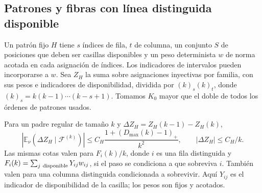 \subsection{Patrones y fibras con línea distinguida disponible}
Un patrón fijo $H$ tiene $s$ índices de fila, $t$ de columna, un conjunto $S$ de posiciones que deben
ser casillas disponibles y un peso determinista $w$ de norma acotada en cada asignación de índices.
Los indicadores de intervalos pueden incorporarse a $w$. Sea $Z_H$ la suma sobre asignaciones
inyectivas por familia, con sus pesos e indicadores de disponibilidad, dividida por $(k)_s(k)_t$,
donde $(k)_s=k(k-1)\cdots(k-s+1)$. Tomamos $K_0$ mayor que el doble de todos los órdenes de patrones
usados.
\begin{lema}\label{lema:incrementos-meso}
Para un padre regular de tamaño $k$ y $\Delta Z_H=Z_H(k-1)-Z_H(k)$,
\[
 |\mathbb E_\nu(\Delta Z_H\mid\mathcal F^{(k)})|
 \le C_H\frac{1+(D_{\max}(k)-1)_+}{k^2},\qquad
 |\Delta Z_H|\le C_H/k .
\]
Las mismas cotas valen para $F_i(k)/k$, donde $i$ es una fila distinguida y $F_i(k)=\sum_{j\ {\rm
disponible}}Y_{ij}w_{ij}$, si el paso se condiciona a que sobreviva $i$. También valen para una
columna distinguida condicionada a sobrevivir. Aquí $Y_{ij}$ es el indicador de disponibilidad de la
casilla; los pesos son fijos y acotados.
\end{lema}
